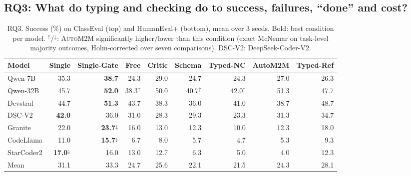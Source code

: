 \documentclass[pdflatex,sn-mathphys-num]{sn-jnl}
\theoremstyle{thmstyleone}%
\theoremstyle{thmstyletwo}%
\theoremstyle{thmstylethree}%
\newcommand{\auto}{\textsc{AutoM2M}}
\begin{document}
\subsection{RQ3: What do typing and checking do to success, failures, ``done'' and cost?}\label{sec:res-rq3}

\begin{table}[t]
\centering\scriptsize
\caption{RQ3. Success (\%) on ClassEval (top) and HumanEval+ (bottom), mean over
3 seeds. Bold: best condition per model. $^{\uparrow}$/$^{\downarrow}$: \auto{}
significantly higher/lower than this condition (exact McNemar on task-level
majority outcomes, Holm-corrected over seven comparisons). DSC-V2:
DeepSeek-Coder-V2.}
\label{tab:success}
\setlength{\tabcolsep}{2.2pt}
\begin{tabular}{@{}l rrrrrrrr@{}}
\toprule
Model & Single & Single-Gate & Free & Critic & Schema & Typed-NC & AutoM2M & Typed-Ref \\
\midrule
Qwen-7B & 35.3 & \textbf{38.7} & 24.3 & 29.0 & 24.7 & 24.3 & 27.0 & 26.3 \\
Qwen-32B & 45.7 & \textbf{52.0} & 38.3$^{\uparrow}$ & 50.0 & 40.7$^{\uparrow}$ & 42.0$^{\uparrow}$ & 51.3 & 47.7 \\
Devstral & 44.7 & \textbf{51.3} & 43.7 & 38.3 & 36.0 & 41.0 & 38.7 & 48.7 \\
DSC-V2 & \textbf{42.0} & 36.0 & 31.0 & 28.3 & 29.3 & 23.3 & 31.3 & 34.7 \\
Granite & 22.0 & \textbf{23.7}$^{\downarrow}$ & 16.0 & 13.0 & 12.3 & 10.0 & 12.3 & 18.0 \\
CodeLlama & 11.0 & \textbf{15.7}$^{\downarrow}$ & 6.7 & 8.0 & 5.7 & 4.7 & 5.3 & 9.3 \\
StarCoder2 & \textbf{17.0}$^{\downarrow}$ & 16.0 & 13.0 & 12.7 & 6.3 & 5.0 & 4.0 & 12.3 \\
\midrule
Mean & 31.1 & 33.3 & 24.7 & 25.6 & 22.1 & 21.5 & 24.3 & 28.1 \\
\bottomrule
\end{tabular}


\end{table}
\end{document}
